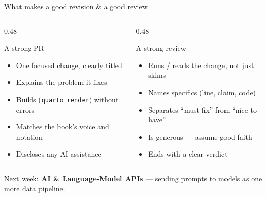 \documentclass[9pt,aspectratio=169]{beamer}
\begin{document}
\begin{frame}{What makes a good revision \& a good review}
    \begin{columns}[T]
        \begin{column}{0.48\textwidth}
            \begin{block}{A strong PR}
                \begin{itemize}\small
                    \item One focused change, clearly titled
                    \item Explains the problem it fixes
                    \item Builds (\texttt{quarto render}) without errors
                    \item Matches the book's voice and notation
                    \item Discloses any AI assistance
                \end{itemize}
            \end{block}
        \end{column}
        \begin{column}{0.48\textwidth}
            \begin{block}{A strong review}
                \begin{itemize}\small
                    \item Runs / reads the change, not just skims
                    \item Names specifics (line, claim, code)
                    \item Separates ``must fix'' from ``nice to have''
                    \item Is generous --- assume good faith
                    \item Ends with a clear verdict
                \end{itemize}
            \end{block}
        \end{column}
    \end{columns}
    \vspace{0.5em}
    \centering\small Next week: \textbf{AI \& Language-Model APIs} --- sending prompts to models as one more data pipeline.
\end{frame}
\end{document}
